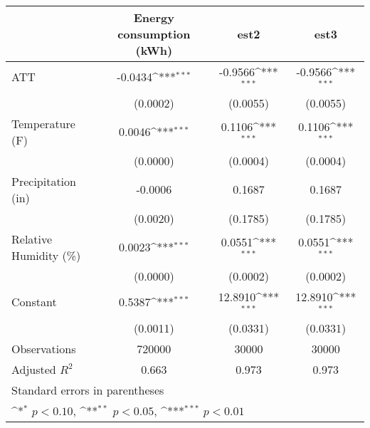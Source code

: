 {
\def\sym#1{\ifmmode^{#1}\else\(^{#1}\)\fi}
\begin{tabular}{l*{3}{c}}
\hline\hline
                    &\multicolumn{1}{c}{Energy consumption (kWh)}&\multicolumn{1}{c}{est2}&\multicolumn{1}{c}{est3}\\
\hline
ATT                 &     -0.0434\sym{***}&     -0.9566\sym{***}&     -0.9566\sym{***}\\
                    &    (0.0002)         &    (0.0055)         &    (0.0055)         \\
[1em]
Temperature (F)     &      0.0046\sym{***}&      0.1106\sym{***}&      0.1106\sym{***}\\
                    &    (0.0000)         &    (0.0004)         &    (0.0004)         \\
[1em]
Precipitation (in)  &     -0.0006         &      0.1687         &      0.1687         \\
                    &    (0.0020)         &    (0.1785)         &    (0.1785)         \\
[1em]
Relative Humidity (\%)&      0.0023\sym{***}&      0.0551\sym{***}&      0.0551\sym{***}\\
                    &    (0.0000)         &    (0.0002)         &    (0.0002)         \\
[1em]
Constant            &      0.5387\sym{***}&     12.8910\sym{***}&     12.8910\sym{***}\\
                    &    (0.0011)         &    (0.0331)         &    (0.0331)         \\
\hline
Observations        &      720000         &       30000         &       30000         \\
Adjusted \(R^{2}\)  &       0.663         &       0.973         &       0.973         \\
\hline\hline
\multicolumn{4}{l}{\footnotesize Standard errors in parentheses}\\
\multicolumn{4}{l}{\footnotesize \sym{*} \(p<0.10\), \sym{**} \(p<0.05\), \sym{***} \(p<0.01\)}\\
\end{tabular}
}
